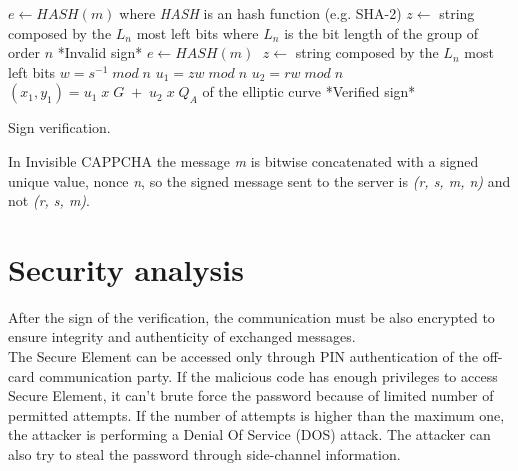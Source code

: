 \begin{itemize}
{\begin{algorithm}[h]
\DontPrintSemicolon
{}
\BlankLine
$e\gets HASH(m)\;$where \textit{HASH} is an hash function (e.g. SHA-2)\;
\BlankLine
$z \gets$ string composed by the $L_n$ most left bits\;
where $L_n$ is the bit length of the group of order $n$\;
\BlankLine
{}
{*Invalid sign*}
$e\gets HASH(m)\;$\;
\BlankLine$z \gets$ string composed by the $L_n$ most left bits\;
$w=s^{-1}\; mod\; n$\;
\BlankLine
$u_1 =zw\; mod\; n$\;
$u_2 =rw\; mod\; n$\;
$(x_1, y_1)=u_1\; x\; G\;+\; u_2\; x\; Q_{A}$ of the elliptic curve\;
\BlankLine
{}
{*Verified sign*}
\BlankLine
\caption{Sign verification.}\label{inv:ECDSA_verify}
\end{algorithm}
}
\end{itemize}
In Invisible CAPPCHA the message \textit{m} is bitwise concatenated with a signed unique value, nonce \textit{n}, so the signed message sent to the server is \textit{(r, s, m, n)} and not \textit{(r, s, m)}.

\section{Security analysis}
After the sign of the verification, the communication must be also encrypted to ensure integrity and authenticity of exchanged messages.\\
The Secure Element can be accessed only through PIN authentication of the off-card communication party. If the malicious code has enough privileges to access Secure Element, it can't brute force the password because of limited number of permitted attempts. If the number of attempts is higher than the maximum one, the attacker is performing a Denial Of Service (DOS) attack. The attacker can also try to steal the password through side-channel information.\\

